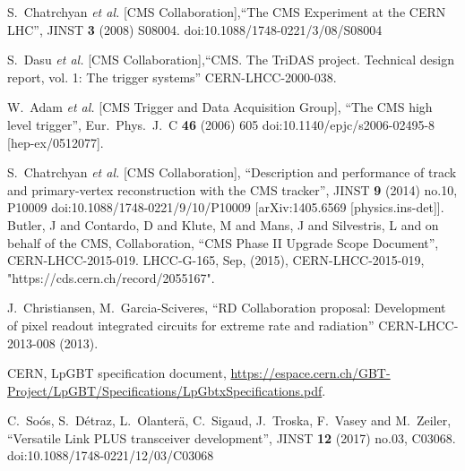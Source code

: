 \begin{thebibliography}{1}
%
 S.~Chatrchyan {\it et al.} [CMS Collaboration],``The CMS Experiment at the CERN LHC'', JINST {\bf 3} (2008) S08004. doi:10.1088/1748-0221/3/08/S08004

  S.~Dasu {\it et al.} [CMS Collaboration],``CMS. The TriDAS project. Technical design report, vol. 1: The trigger systems'' CERN-LHCC-2000-038.


  W.~Adam {\it et al.} [CMS Trigger and Data Acquisition Group], ``The CMS high level trigger'',  Eur.\ Phys.\ J.\ C {\bf 46} (2006) 605 doi:10.1140/epjc/s2006-02495-8 [hep-ex/0512077].


  S.~Chatrchyan {\it et al.} [CMS Collaboration], ``Description and performance of track and primary-vertex reconstruction with the CMS tracker'', JINST {\bf 9} (2014) no.10,  P10009 doi:10.1088/1748-0221/9/10/P10009  [arXiv:1405.6569 [physics.ins-det]].
 Butler, J and Contardo, D and Klute, M and Mans, J and
                       Silvestris, L and on behalf of the CMS, Collaboration,
      ``CMS Phase II Upgrade Scope Document'',
      CERN-LHCC-2015-019. LHCC-G-165,
      Sep, (2015),
      CERN-LHCC-2015-019, "https://cds.cern.ch/record/2055167".

 J.~Christiansen, M.~Garcia-Sciveres, ``RD Collaboration proposal: Development of pixel readout integrated circuits for extreme rate and radiation''
CERN-LHCC-2013-008 (2013).

 CERN, LpGBT specification document,
\url{https://espace.cern.ch/GBT-Project/LpGBT/Specifications/LpGbtxSpecifications.pdf}.

 C.~Soós, S.~Détraz, L.~Olanterä, C.~Sigaud, J.~Troska, F.~Vasey and M.~Zeiler, ``Versatile Link PLUS transceiver development'', JINST {\bf 12} (2017) no.03,  C03068. doi:10.1088/1748-0221/12/03/C03068



\end{thebibliography}
